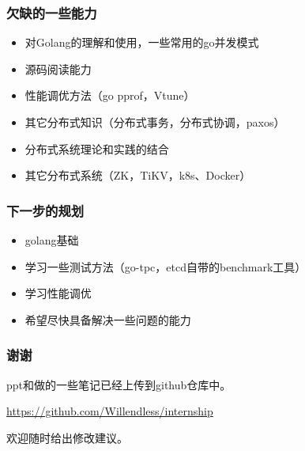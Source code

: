 \documentclass{beamer}
\begin{document}
%
%

\begin{frame}
\frametitle{欠缺的一些能力}

\begin{itemize}
    \item 对Golang的理解和使用，一些常用的go并发模式
    \item 源码阅读能力
    \item 性能调优方法（go pprof，Vtune）
    \item 其它分布式知识（分布式事务，分布式协调，paxos）
    \item 分布式系统理论和实践的结合
    \item 其它分布式系统（ZK，TiKV，k8s、Docker）
\end{itemize}

\end{frame}

%
%

\begin{frame}
\frametitle{下一步的规划}

\begin{itemize}
    \item golang基础
    \item 学习一些测试方法（go-tpc，etcd自带的benchmark工具）
    \item 学习性能调优
    \item 希望尽快具备解决一些问题的能力
\end{itemize}

\end{frame}

%
%

\begin{frame}
\frametitle{谢谢}

ppt和做的一些笔记已经上传到github仓库中。

\url{https://github.com/Willendless/internship}

欢迎随时给出修改建议。

\end{frame}
\end{document}
